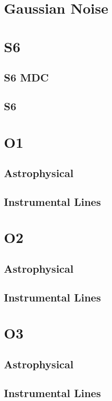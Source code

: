 \section{Gaussian Noise}

\section{S6}

\subsection{S6 MDC}

\subsection{S6}

\section{O1}

\subsection{Astrophysical}

\subsection{Instrumental Lines}

\section{O2}

\subsection{Astrophysical}

\subsection{Instrumental Lines}

\section{O3}

\subsection{Astrophysical}

\subsection{Instrumental Lines}
